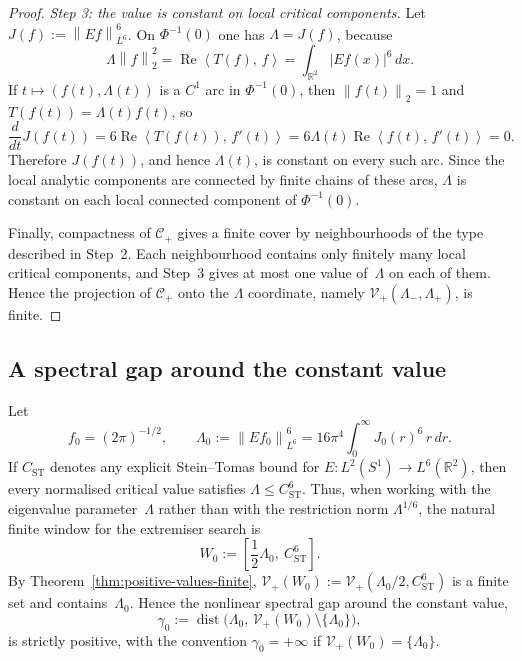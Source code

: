 \documentclass[12pt]{article}
\theoremstyle{definition}
\theoremstyle{remark}
\newcommand{\R}{\mathbb{R}}
\newcommand{\norm}[1]{\left\|#1\right\|}
\newcommand{\ip}[2]{\left\langle #1,\, #2\right\rangle}
\newcommand{\re}{\operatorname{Re}}
\begin{document}
\begin{proof}
  \emph{Step 3: the value is constant on local critical components.}
  Let $J(f):=\norm{Ef}_{L^6}^6$.  On $\Phi^{-1}(0)$ one has
  $\Lambda=J(f)$, because
  \[
    \Lambda\norm{f}_2^2
    =\re\ip{T(f)}{f}
    =\int_{\R^2}|Ef(x)|^6\,dx.
  \]
  If $t\mapsto(f(t),\Lambda(t))$ is a $C^1$ arc in $\Phi^{-1}(0)$, then
  $\norm{f(t)}_2=1$ and $T(f(t))=\Lambda(t)f(t)$, so
  \[
    \frac{d}{dt}J(f(t))
    =6\re\ip{T(f(t))}{f'(t)}
    =6\Lambda(t)\re\ip{f(t)}{f'(t)}
    =0.
  \]
  Therefore $J(f(t))$, and hence $\Lambda(t)$, is constant on every such
  arc.  Since the local analytic components are connected by finite
  chains of these arcs, $\Lambda$ is constant on each local connected
  component of $\Phi^{-1}(0)$.

  Finally, compactness of $\mathcal C_+$ gives a finite cover by
  neighbourhoods of the type described in Step~2.  Each neighbourhood
  contains only finitely many local critical components, and Step~3 gives
  at most one value of~$\Lambda$ on each of them.  Hence the projection
  of $\mathcal C_+$ onto the $\Lambda$ coordinate, namely
  $\mathcal V_+(\Lambda_-,\Lambda_+)$, is finite.
\end{proof}

\subsection{A spectral gap around the constant value}

Let
\[
  f_0=(2\pi)^{-1/2},\qquad
  \Lambda_0:=\norm{Ef_0}_{L^6}^6
  =16\pi^4\int_0^\infty J_0(r)^6\,r\,dr.
\]
If $C_{\mathrm{ST}}$ denotes any explicit Stein--Tomas bound for
$E:L^2(S^1)\to L^6(\R^2)$, then every normalised critical value satisfies
$\Lambda\leq C_{\mathrm{ST}}^6$.  Thus, when working with the eigenvalue
parameter~$\Lambda$ rather than with the restriction norm
$\Lambda^{1/6}$, the natural finite window for the extremiser search is
\[
  W_0:=\left[\frac12\Lambda_0,\ C_{\mathrm{ST}}^6\right].
\]
By Theorem~\ref{thm:positive-values-finite},
$\mathcal V_+(W_0):=\mathcal V_+(\Lambda_0/2,C_{\mathrm{ST}}^6)$ is a
finite set and contains~$\Lambda_0$.  Hence the nonlinear spectral gap
around the constant value,
\begin{equation}\label{eq:positive-gap-def}
  \gamma_0
  :=
  \operatorname{dist}\bigl(
    \Lambda_0,\,
    \mathcal V_+(W_0)\setminus\{\Lambda_0\}
  \bigr),
\end{equation}
is strictly positive, with the convention $\gamma_0=+\infty$ if
$\mathcal V_+(W_0)=\{\Lambda_0\}$.
\end{document}
